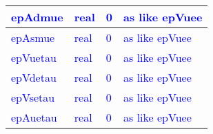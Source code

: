 \documentclass{article}
\begin{document}
\begin{longtable}{llll}
\midrule
\textcolor{blue}{epAdmue} & \begin{minipage}[t]{2cm}\textcolor{blue}{real}\end{minipage} & \begin{minipage}[t]{2cm}\textcolor{blue}{0}\end{minipage} & \begin{minipage}[t]{12cm}\textcolor{blue}{as like epVuee}\end{minipage}\\*
\midrule
\textcolor{blue}{epAsmue} & \begin{minipage}[t]{2cm}\textcolor{blue}{real}\end{minipage} & \begin{minipage}[t]{2cm}\textcolor{blue}{0}\end{minipage} & \begin{minipage}[t]{12cm}\textcolor{blue}{as like epVuee}\end{minipage}\\*
\midrule
\textcolor{blue}{epVuetau} & \begin{minipage}[t]{2cm}\textcolor{blue}{real}\end{minipage} & \begin{minipage}[t]{2cm}\textcolor{blue}{0}\end{minipage} & \begin{minipage}[t]{12cm}\textcolor{blue}{as like epVuee}\end{minipage}\\*
\midrule
\textcolor{blue}{epVdetau} & \begin{minipage}[t]{2cm}\textcolor{blue}{real}\end{minipage} & \begin{minipage}[t]{2cm}\textcolor{blue}{0}\end{minipage} & \begin{minipage}[t]{12cm}\textcolor{blue}{as like epVuee}\end{minipage}\\*
\midrule
\textcolor{blue}{epVsetau} & \begin{minipage}[t]{2cm}\textcolor{blue}{real}\end{minipage} & \begin{minipage}[t]{2cm}\textcolor{blue}{0}\end{minipage} & \begin{minipage}[t]{12cm}\textcolor{blue}{as like epVuee}\end{minipage}\\*
\midrule
\textcolor{blue}{epAuetau} & \begin{minipage}[t]{2cm}\textcolor{blue}{real}\end{minipage} & \begin{minipage}[t]{2cm}\textcolor{blue}{0}\end{minipage} & \begin{minipage}[t]{12cm}\textcolor{blue}{as like epVuee}\end{minipage}\\*

\end{longtable}
\end{document}
